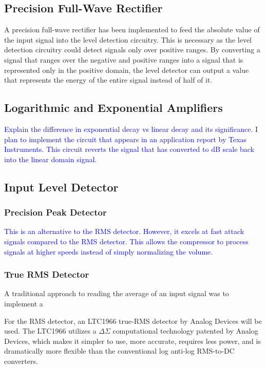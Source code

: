 \documentclass[10pt]{article}
\begin{document}
\begin{multicols*}{2}
            \subsection{Precision Full-Wave Rectifier}
                A precision full-wave rectifier has been implemented to feed the absolute value of the input signal into the level detection circuitry. This is necessary as the level detection circuitry could detect signals only over positive ranges. By converting a signal that ranges over the negative and positive ranges into a signal that is represented only in the positive domain, the level detector can output a value that represents the energy of the entire signal instead of half of it.
                
            \subsection{Logarithmic and Exponential Amplifiers}
                \textcolor{blue}{Explain the difference in exponential decay vs linear decay and its significance. I plan to implement the circuit that appears in an application report \cite{ti-log-conv} by Texas Instruments.}
                \textcolor{blue}{This circuit reverts the signal that has converted to dB scale back into the linear domain signal.}
            
            \subsection{Input Level Detector}

                \subsubsection{Precision Peak Detector}
                    \textcolor{blue}{This is an alternative to the RMS detector. However, it excels at fast attack signals compared to the RMS detector. This allows the compressor to process signals at higher speeds instead of simply normalizing the volume.}  

                \subsubsection{True RMS Detector}
                    A traditional approach to reading the average of an input signal was to implement a 
                    
                    For the RMS detector, an LTC1966 true-RMS detector by Analog Devices will be used. The LTC1966 utilizes a $\Delta\Sigma$ computational technology patented by Analog Devices, which makes it simpler to use, more accurate, requires less power, and is dramatically more flexible than the conventional log anti-log RMS-to-DC converters.                          
            

\end{multicols*}
\end{document}
